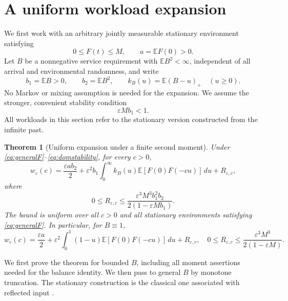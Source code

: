 \documentclass[aap,preprint]{imsart}
\numberwithin{equation}{section}
\theoremstyle{plain}
\newtheorem{theorem}{Theorem}[section]
\theoremstyle{definition}
\newcommand{\E}{\mathbb E}
\newcommand{\1}{\mathbf 1}
\newcommand{\eps}{\varepsilon}
\begin{document}
\section{A uniform workload expansion}\label{sec:expansion}
We first work with an arbitrary jointly measurable stationary environment satisfying
\begin{equation}\label{eq:generalF}
 0\le F(t)\le M,\qquad a=\E F(0)>0.
\end{equation}
Let $B$ be a nonnegative service requirement with $\E B^2<\infty$, independent of all arrival and environmental randomness, and write
\begin{equation}\label{eq:moments}
 b_1=\E B>0,\qquad b_2=\E B^2,
 \qquad k_B(u)=\E(B-u)_+\quad(u\ge0).
\end{equation}
No Markov or mixing assumption is needed for the expansion. We assume the stronger, convenient stability condition
\begin{equation}\label{eq:domstability}
 \eps M b_1<1.
\end{equation}
All workloads in this section refer to the stationary version constructed from the infinite past.

\begin{theorem}[Uniform expansion under a finite second moment]\label{thm:expansion}
Under \eqref{eq:generalF}--\eqref{eq:domstability}, for every $c>0$,
\begin{equation}\label{eq:expansion}
 w_\eps(c)=\frac{\eps a b_2}{2}
 +\eps^2 b_1\int_0^\infty k_B(u)\E[F(0)F(-cu)]\,du+R_{\eps,c},
\end{equation}
where
\begin{equation}\label{eq:remainder}
 0\le R_{\eps,c}\le
 \frac{\eps^3 M^3 b_1^2 b_2}{2(1-\eps M b_1)}.
\end{equation}
The bound is uniform over all $c>0$ and all stationary environments satisfying \eqref{eq:generalF}. In particular, for $B\equiv1$,
\begin{equation}\label{eq:unitexpansion}
 w_\eps(c)=\frac{\eps a}{2}
 +\eps^2\int_0^1(1-u)\E[F(0)F(-cu)]\,du+R_{\eps,c},
 \quad 0\le R_{\eps,c}\le\frac{\eps^3 M^3}{2(1-\eps M)}.
\end{equation}
\end{theorem}
We first prove the theorem for bounded $B$, including all moment assertions needed for the balance identity. We then pass to general $B$ by monotone truncation. The stationary construction is the classical one associated with reflected input \cite{Loynes62,Asmussen03}.
\end{document}
